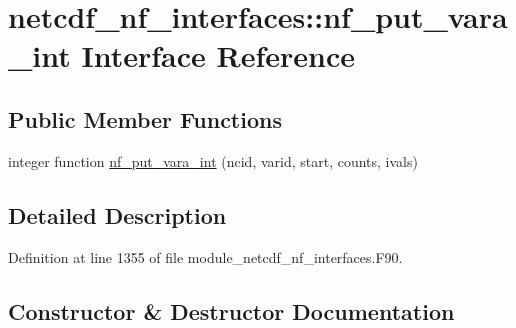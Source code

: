 \hypertarget{interfacenetcdf__nf__interfaces_1_1nf__put__vara__int}{}\section{netcdf\+\_\+nf\+\_\+interfaces\+:\+:nf\+\_\+put\+\_\+vara\+\_\+int Interface Reference}
\label{interfacenetcdf__nf__interfaces_1_1nf__put__vara__int}
\subsection*{Public Member Functions}
\begin{DoxyCompactItemize}
\item 
integer function \hyperlink{interfacenetcdf__nf__interfaces_1_1nf__put__vara__int_a949e3491f4c0abd33bb20ee2f2eb20f9}{nf\+\_\+put\+\_\+vara\+\_\+int} (ncid, varid, start, counts, ivals)
\end{DoxyCompactItemize}


\subsection{Detailed Description}


Definition at line 1355 of file module\+\_\+netcdf\+\_\+nf\+\_\+interfaces.\+F90.



\subsection{Constructor \& Destructor Documentation}
\mbox{\label{interfacenetcdf__nf__interfaces_1_1nf__put__vara__int_a949e3491f4c0abd33bb20ee2f2eb20f9}} 
